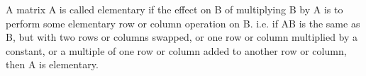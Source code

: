 A matrix A is called elementary if the effect on B of multiplying
B by A is to perform some elementary row or column operation
on B. i.e. if AB is the same as B, but with two rows or columns swapped,
or one row or column multiplied by a constant, or a multiple of one
row or column added to another row or column, then A is elementary.